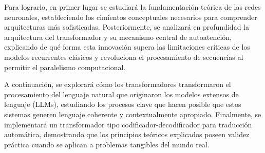 Para lograrlo, en primer lugar se estudiará la fundamentación teórica de las redes neuronales, estableciendo 
los cimientos conceptuales necesarios para comprender arquitecturas más sofisticadas. Posteriormente, se analizará en 
profundidad la arquitectura del transformador y su mecanismo central de autoatención, explicando de qué forma esta 
innovación supera las limitaciones críticas de los modelos recurrentes clásicos y revoluciona el procesamiento de 
secuencias al permitir el paralelismo computacional.

A continuación, se explorará cómo los transformadores transformaron el procesamiento del lenguaje natural que 
originaron los modelos extensos de lenguaje (LLMs), estudiando los procesos clave que hacen posible que estos sistemas generen 
lenguaje coherente y contextualmente apropiado. Finalmente, se implementará un transformador tipo 
codificador-decodificador para traducción automática, demostrando que los principios teóricos explicados poseen 
validez práctica cuando se aplican a problemas tangibles del mundo real.
